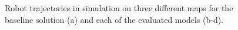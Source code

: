 \documentclass{article}
\begin{document}
\begin{figure}
    \caption{Robot trajectories in simulation on three different maps for the baseline solution (a) and each of the evaluated models (b-d).}
  \label{fig:sim_results_original}
\end{figure}
\end{document}
